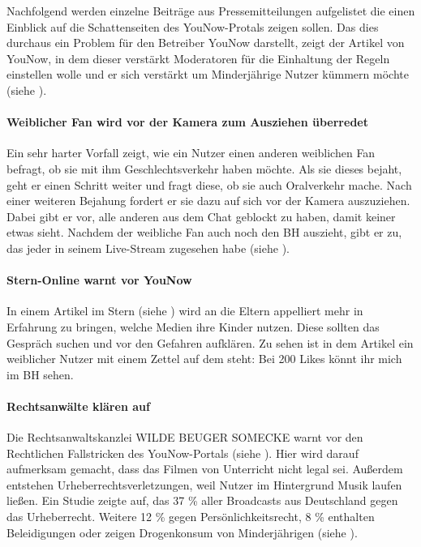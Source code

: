 Nachfolgend werden einzelne Beiträge aus Pressemitteilungen aufgelistet die einen Einblick auf die Schattenseiten des YouNow-Protals zeigen sollen. Das dies durchaus ein Problem für den Betreiber YouNow darstellt, zeigt der Artikel von YouNow, in dem dieser verstärkt Moderatoren für die Einhaltung der Regeln einstellen wolle und er sich verstärkt um Minderjährige Nutzer kümmern möchte (siehe \cite{YTD15}).

\paragraph{Weiblicher Fan wird vor der Kamera zum Ausziehen überredet}
Ein sehr harter Vorfall zeigt, wie ein Nutzer einen anderen weiblichen Fan befragt, ob sie mit ihm Geschlechtsverkehr haben möchte. Als sie dieses bejaht, geht er einen Schritt weiter und fragt diese, ob sie auch Oralverkehr mache. Nach einer weiteren Bejahung fordert er sie dazu auf sich vor der Kamera auszuziehen. Dabei gibt er vor, alle anderen aus dem Chat geblockt zu haben, damit keiner etwas sieht. Nachdem der weibliche Fan auch noch den BH auszieht, gibt er zu, das jeder in seinem Live-Stream zugesehen habe (siehe \cite{MD10}).

\paragraph{Stern-Online warnt vor YouNow}
In einem Artikel im Stern (siehe \cite{STERN15}) wird an die Eltern appelliert mehr in Erfahrung zu bringen, welche Medien ihre Kinder nutzen. Diese sollten das Gespräch suchen und vor den Gefahren aufklären. Zu sehen ist in dem Artikel ein weiblicher Nutzer mit einem Zettel auf dem steht: \glqq Bei 200 Likes könnt ihr mich im BH sehen\grqq .

\paragraph{Rechtsanwälte klären auf}
Die Rechtsanwaltskanzlei WILDE BEUGER SOMECKE warnt vor den Rechtlichen Fallstricken des YouNow-Portals (siehe \cite{WBS15}). Hier wird darauf aufmerksam gemacht, dass das Filmen von Unterricht nicht legal sei. Außerdem entstehen Urheberrechtsverletzungen, weil Nutzer im Hintergrund Musik laufen ließen. Ein Studie zeigte auf, das 37 \% aller Broadcasts aus Deutschland gegen das Urheberrecht. Weitere 12 \% gegen Persönlichkeitsrecht, 8 \% enthalten Beleidigungen oder zeigen Drogenkonsum von Minderjährigen (siehe \cite{HFMNF15}).

